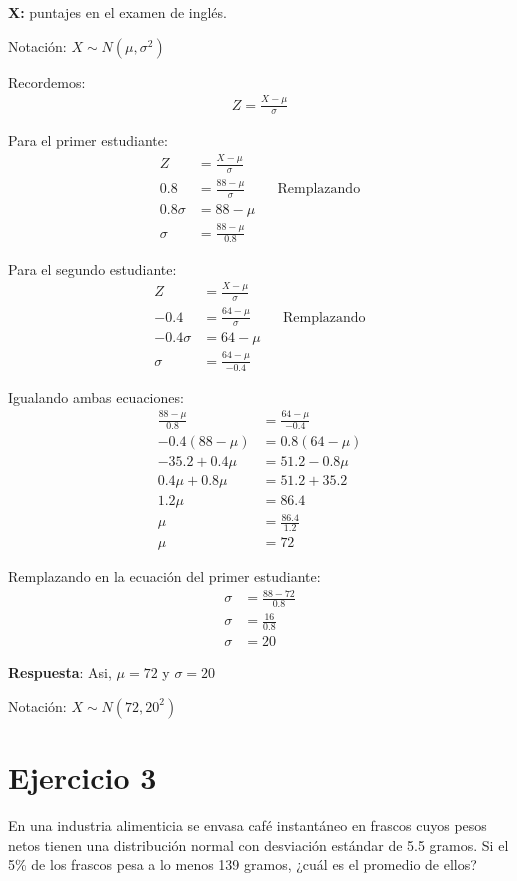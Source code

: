 \documentclass{templateNote}
\begin{document}
\textbf{X:} puntajes en el examen de inglés.

Notación: $X \sim N(\mu, \sigma^2)$

Recordemos:
\begin{align*}
  Z = \frac{X - \mu}{\sigma}
\end{align*}

Para el primer estudiante:
\begin{align*}
  Z &= \frac{X - \mu}{\sigma} \\
  0.8 &= \frac{88 - \mu}{\sigma} && \text{Remplazando} \\
  0.8\sigma &= 88 - \mu \\
  \sigma &= \frac{88 - \mu}{0.8}
\end{align*}

Para el segundo estudiante:
\begin{align*}
  Z &= \frac{X - \mu}{\sigma} \\
  -0.4 &= \frac{64 - \mu}{\sigma} && \text{Remplazando} \\
  -0.4\sigma &= 64 - \mu \\
  \sigma &= \frac{64 - \mu}{-0.4}
\end{align*}

Igualando ambas ecuaciones:
\begin{align*}
  \frac{88 - \mu}{0.8} &= \frac{64 - \mu}{-0.4} \\
  -0.4(88 - \mu) &= 0.8(64 - \mu) \\
  -35.2 + 0.4\mu &= 51.2 - 0.8\mu \\
  0.4\mu + 0.8\mu &= 51.2 + 35.2 \\
  1.2\mu &= 86.4 \\
  \mu &= \frac{86.4}{1.2} \\
  \mu &= 72
\end{align*}

Remplazando en la ecuación del primer estudiante:
\begin{align*}
  \sigma &= \frac{88 - 72}{0.8} \\
  \sigma &= \frac{16}{0.8} \\
  \sigma &= 20
\end{align*}

\textbf{Respuesta}: Asi, $\mu = 72$ y $\sigma = 20$

Notación: $X \sim N(72, 20^2)$

\newpage
\section*{Ejercicio 3}
En una industria alimenticia se envasa café instantáneo en frascos cuyos pesos netos tienen una distribución normal con desviación estándar de 5.5 gramos. Si el 5\% de los frascos pesa a lo menos 139 gramos, ¿cuál es el promedio de ellos?
\end{document}
